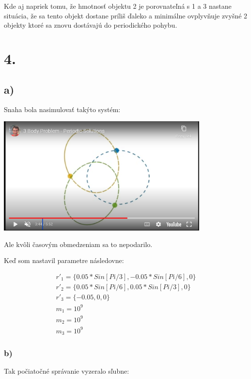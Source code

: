 \documentclass[a4paper]{article}
\begin{document}
	Kde aj napriek tomu, že hmotnosť objektu 2 je porovnateľná s 1 a 3 nastane situácia, že sa tento objekt dostane príliš ďaleko a minimálne ovplyvňuje zvyšné 2 objekty ktoré sa znovu dostávajú do periodického pohybu.
	 
	\section{4.}
	
	\subsection{a)}
	
	Snaha bola nasimulovať takýto systém:
	
	\centerline{\includegraphics[width=0.8\textwidth]{system}}
	
	Ale kvôli časovým obmedzeniam sa to nepodarilo.
	
	Keď som nastavil parametre následovne:
	

	
	\begin{align*}
		r'_1=\{0.05*Sin[Pi/3],-0.05*Sin[Pi/6],0\}\\
		r'_2=\{0.05*Sin[Pi/6],0.05*Sin[Pi/3],0\}\\
		r'_3=\{-0.05,0,0\}\\
		m_1=10^9\\
		m_2=10^9\\
		m_3=10^9
	\end{align*}
	
	\subsubsection{b)}
	
	Tak počiatočné správanie vyzeralo sľubne:
	
\end{document}

